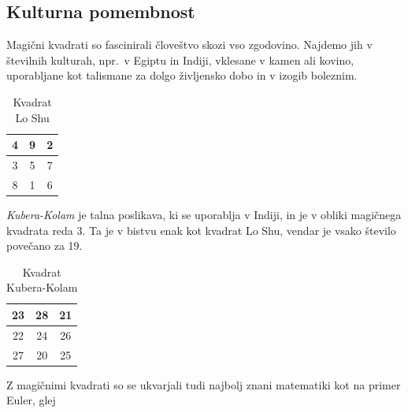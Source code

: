 \documentclass[a4paper,12pt]{article}
\begin{document}

\subsection{Kulturna pomembnost}

Magični kvadrati so fascinirali človeštvo skozi vso zgodovino. Najdemo jih
v številnih kulturah, npr.\ v Egiptu in Indiji, vklesane v kamen ali
kovino, uporabljane kot talismane za dolgo življensko dobo in v
izogib boleznim.
\begin{table}
   \caption{Kvadrat Lo Shu}
   \label{table:loshu}
   \begin{center}
      \begin{tabular}{|c|c|c|}
         \hline
         4 & 9 & 2 \\\hline
         3 & 5 & 7 \\\hline
         8 & 1 & 6 \\\hline 
      \end{tabular}
   \end{center}
\end{table}

\emph{Kubera-Kolam} je talna poslikava, ki se uporablja v Indiji, in je v
obliki magičnega kvadrata reda 3. Ta je v bistvu enak kot kvadrat
Lo Shu, vendar je vsako število povečano za 19.

   \begin{table}
      \caption{Kvadrat Kubera-Kolam}
     \begin{center}
       \label{table:kubera}
       \begin{tabular}{|c|c|c|}
          \hline
          23 & 28 & 21 \\ \hline
          22 & 24 & 26 \\ \hline
          27 & 20 & 25 \\ \hline
       \end{tabular}
     \end{center}
   \end{table}

Z magičnimi kvadrati so se ukvarjali tudi najbolj znani matematiki kot na
primer Euler, glej  \cite{euler} %
\end{document}
